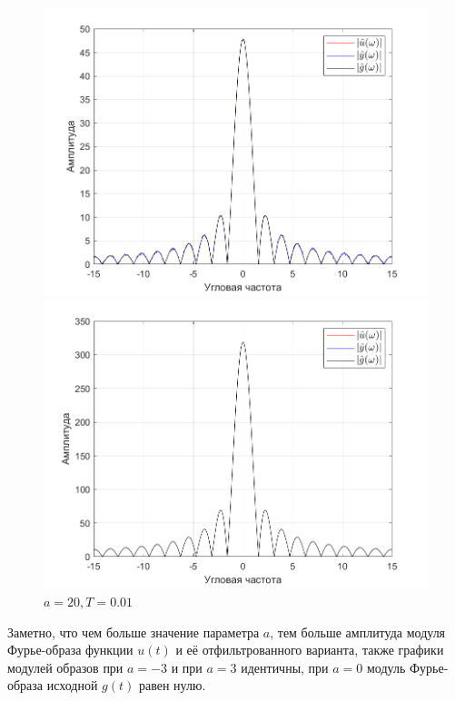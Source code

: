 \documentclass[a4paper]{article}
\begin{document}
\begin{figure}[H]
    \begin{minipage}{0.5\textwidth}
        \centering
        \includegraphics[width=\linewidth]{ex1_1/a=3_T=0.01/h3.png}
        \caption{$a = 3, T = 0.01$}
    \end{minipage}
    \begin{minipage}{0.5\textwidth}
        \centering
        \includegraphics[width=\linewidth]{ex1_1/a=20_T=0.01/h3.png}
        \caption{$a = 20, T = 0.01$}
    \end{minipage}
\end{figure}

Заметно, что чем больше значение параметра $a$, тем больше амплитуда модуля Фурье-образа функции $u(t)$ и её отфильтрованного варианта, также графики модулей образов при $a = -3$ и при $a = 3$ идентичны, при $a = 0$ модуль Фурье-образа исходной $g(t)$ равен нулю.
\end{document}

